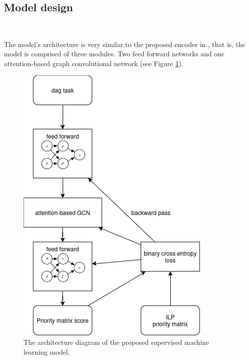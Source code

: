 \subsection{Model design}
~

The model's architecture is very similar to the proposed encoder in \citet{Lee2021GlobalDagSchedDRL},
that is, the model is comprised of three modules.
Two feed forward networks and one attention-based graph convolutional network (see Figure \ref{fig:model_diagram}).

\begin{figure}
    \centering
    \includegraphics[width=\linewidth]{images/designed_model.png}
    \caption{The architecture diagram of the proposed supervised machine learning model.}
    \label{fig:model_diagram}
\end{figure}

